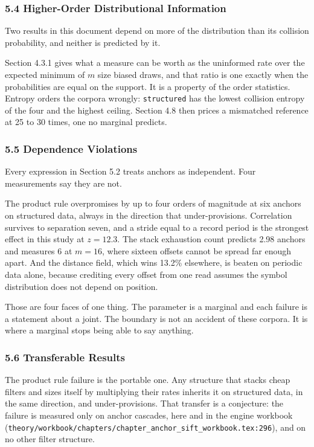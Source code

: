 \subsubsection{5.4 Higher-Order Distributional Information}

Two results in this document depend on more of the distribution than its collision probability, and neither is predicted by it.

Section 4.3.1 gives what a measure can be worth as the uninformed rate over the expected minimum of \(m\) size biased draws, and that ratio is one exactly when the probabilities are equal on the support. It is a property of the order statistics. Entropy orders the corpora wrongly: \texttt{structured} has the lowest collision entropy of the four and the highest ceiling. Section 4.8 then prices a mismatched reference at 25 to 30 times, one no marginal predicts.

\subsubsection{5.5 Dependence Violations}

Every expression in Section 5.2 treats anchors as independent. Four measurements say they are not.

The product rule overpromises by up to four orders of magnitude at six anchors on structured data, always in the direction that under-provisions. Correlation survives to separation seven, and a stride equal to a record period is the strongest effect in this study at \(z = 12.3\). The stack exhaustion count predicts 2.98 anchors and measures 6 at \(m = 16\), where sixteen offsets cannot be spread far enough apart. And the distance field, which wins 13.2\% elsewhere, is beaten on periodic data alone, because crediting every offset from one read assumes the symbol distribution does not depend on position.

Those are four faces of one thing. The parameter is a marginal and each failure is a statement about a joint. The boundary is not an accident of these corpora. It is where a marginal stops being able to say anything.

\subsubsection{5.6 Transferable Results}

The product rule failure is the portable one. Any structure that stacks cheap filters and sizes itself by multiplying their rates inherits it on structured data, in the same direction, and under-provisions. That transfer is a conjecture: the failure is measured only on anchor cascades, here and in the engine workbook (\texttt{theory/\allowbreak{}workbook/\allowbreak{}chapters/\allowbreak{}chapter\_anchor\_sift\_workbook.tex:296}), and on no other filter structure.

